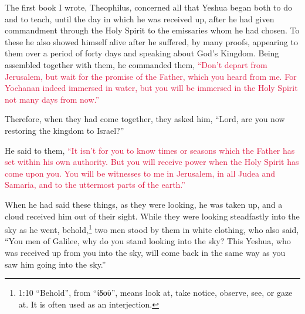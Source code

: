 





\vspace{-1.36in}

\mychapter{} \myverse*{}The first book I wrote, Theophilus, concerned all that Yeshua began
both to do and to teach,
\myverse{}until the day in which he was received up, after he had given commandment through
the Holy Spirit to the emissaries whom he had chosen.
\myverse{}To these he also showed himself alive after he suffered, by many proofs, appearing
to them over a period of forty days and speaking about God’s Kingdom.
\myverse{}Being assembled together with them, he commanded them,
\textcolor{crimson}{“Don’t depart from Jerusalem, but wait for the promise of the Father, which you heard from me.
}
\myverse{}\textcolor{crimson}{For Yochanan indeed immersed in water, but you will be immersed in the Holy
	Spirit not many days from now.”}

\myverse{}Therefore, when they had come together, they asked him, “Lord,
are you now restoring the kingdom to Israel?”

\myverse{}He said to them,
\textcolor{crimson}{“It isn’t for you to know times or seasons which the Father has set within his own authority.
}
\myverse{}\textcolor{crimson}{But you will receive power when the Holy Spirit has come upon you. You will
	be witnesses to me in Jerusalem, in all Judea and Samaria, and to the uttermost parts of the earth.”}

\myverse{}When he had said these things, as they were looking, he was taken
up, and a cloud received him out of their sight.
\myverse{}While they were looking steadfastly into the sky as he went, behold,\footnote{1:10 “Behold”, from “ἰδοὺ”, means look at, take notice, observe, see, or gaze at. It is often used
	as an interjection.} two men stood by them in white clothing,
\myverse{}who also said, “You men of Galilee, why do you stand looking into the sky?
This Yeshua, who was received up from you into the sky, will come back in the same way as you saw him
going into the sky.”

